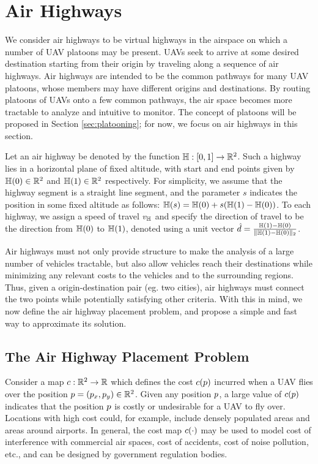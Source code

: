 \section{Air Highways}
We consider air highways to be virtual highways in the airspace on which a number of UAV platoons may be present. UAVs seek to arrive at some desired destination starting from their origin by traveling along a sequence of air highways. Air highways are intended to be the common pathways for many UAV platoons, whose members may have different origins and destinations. By routing platoons of UAVs onto a few common pathways, the air space becomes more tractable to analyze and intuitive to monitor. The concept of platoons will be proposed in Section \ref{sec:platooning}; for now, we focus on air highways in this section.

Let an air highway be denoted by the function $\mathbb{H}: [0, 1] \rightarrow \mathbb{R}^2$. Such a highway lies in a horizontal plane of fixed altitude, with start and end points given by $\mathbb{H}(0)\in\mathbb{R}^2$ and $\mathbb{H}(1)\in\mathbb{R}^2$ respectively. For simplicity, we assume that the highway segment is a straight line segment, and the parameter $s$ indicates the position in some fixed altitude as follows: $\mathbb{H}(s) = \mathbb{H}(0) + s(\mathbb{H}(1) - \mathbb{H}(0))$. To each highway, we assign a speed of travel $v_{\mathbb{H}}$ and specify the direction of travel to be the direction from $\mathbb{H}(0)$ to $\mathbb{H}(1)$, denoted using a unit vector $\hat{d} = \frac{\mathbb{H}(1) - \mathbb{H}(0)}{\lVert\mathbb{H}(1) - \mathbb{H}(0)\rVert_2}$.

Air highways must not only provide structure to make the analysis of a large number of vehicles tractable, but also allow vehicles reach their destinations while minimizing any relevant costs to the vehicles and to the surrounding regions. Thus, given a origin-destination pair (eg. two cities), air highways must connect the two points while potentially satisfying other criteria. With this in mind, we now define the air highway placement problem, and propose a simple and fast way to approximate its solution.

\subsection{The Air Highway Placement Problem}
Consider a map $c:\mathbb{R}^2 \rightarrow \mathbb{R}$ which defines the cost $c(p)$ incurred when a UAV flies over the position $p=(p_x,p_y)\in\mathbb{R}^2$. Given any position $p$, a large value of $c(p)$ indicates that the position $p$ is costly or undesirable for a UAV to fly over. Locations with high cost could, for example, include densely populated areas and areas around airports. In general, the cost map $c(\cdot)$ may be used to model cost of interference with commercial air spaces, cost of accidents, cost of noise pollution, etc., and can be designed by government regulation bodies.

